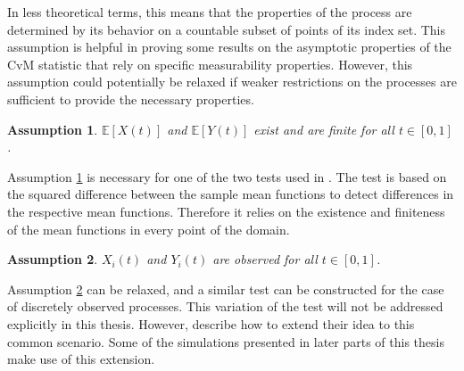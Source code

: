 \documentclass[12pt, a4paper]{article}
\theoremstyle{MAstyle} \newtheorem{assumption}{Assumption}[section]
\theoremstyle{MAstyle} \newtheorem{definition}{Definition}[section]
\theoremstyle{MAstyle} \newtheorem{theorem}{Theorem}[section]
\begin{document}
			In less theoretical terms, this means that the properties of the process are determined by its behavior on a countable subset of points of its index set. This assumption is helpful in proving some results on the asymptotic properties of the CvM statistic that rely on specific measurability properties. However, this assumption could potentially be relaxed if weaker restrictions on the processes are sufficient to provide the necessary properties.
		
			\begin{assumption}\label{mean_existence}
				$\mathbb{E}\left[X(t)\right]$ and $\mathbb{E}\left[Y(t)\right]$ exist and are finite for all $t \in [0, 1]$.
			\end{assumption}
			Assumption \ref{mean_existence} is necessary for one of the two tests used in \cite{bugni_permutation_2021}. The test is based on the squared difference between the sample mean functions to detect differences in the respective mean functions. Therefore it relies on the existence and finiteness of the mean functions in every point of the domain.
		
			\begin{assumption}\label{continuous_observation}
				$X_i(t)$ and $Y_i(t)$ are observed for all $t \in [0,1]$.
			\end{assumption}
			Assumption \ref{continuous_observation} can be relaxed, and a similar test can be constructed for the case of discretely observed processes. This variation of the test will not be addressed explicitly in this thesis. However, \cite{bugni_permutation_2021} describe how to extend their idea to this common scenario. Some of the simulations presented in later parts of this thesis make use of this extension.
	
\end{document}
